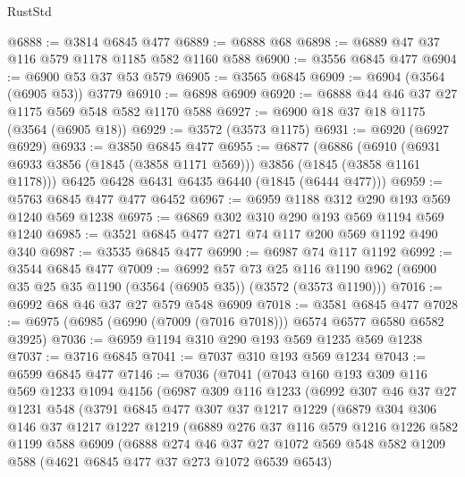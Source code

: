 \begin{lexlean}{RustStd}
\begin{coremodule}
@6888 := @3814 @6845 @477
@6889 := @6888 @68
@6898 := @6889 @47 @37 @116 @579 @1178 @1185 @582 @1160 @588
@6900 := @3556 @6845 @477
@6904 := @6900 @53 @37 @53 @579
@6905 := @3565 @6845
@6909 := @6904 (@3564 (@6905 @53)) @3779
@6910 := @6898 @6909
@6920 := @6888 @44 @46 @37 @27 @1175 @569 @548 @582 @1170 @588
@6927 := @6900 @18 @37 @18 @1175 (@3564 (@6905 @18))
@6929 := @3572 (@3573 @1175)
@6931 := @6920 (@6927 @6929)
@6933 := @3850 @6845 @477
@6955 := @6877
    (@6886
      (@6910 (@6931 @6933 @3856 (@1845 (@3858 @1171 @569))) @3856 (@1845 (@3858 @1161 @1178)))
      @6425
      @6428
      @6431
      @6435
      @6440
      (@1845 (@6444 @477)))
@6959 := @5763 @6845 @477 @477 @6452
@6967 := @6959 @1188 @312 @290 @193 @569 @1240 @569 @1238
@6975 := @6869 @302 @310 @290 @193 @569 @1194 @569 @1240
@6985 := @3521 @6845 @477 @271 @74 @117 @200 @569 @1192 @490 @340
@6987 := @3535 @6845 @477
@6990 := @6987 @74 @117 @1192
@6992 := @3544 @6845 @477
@7009 := @6992
    @57
    @73
    @25
    @116
    @1190
    @962
    (@6900 @35 @25 @35 @1190 (@3564 (@6905 @35)) (@3572 (@3573 @1190)))
@7016 := @6992 @68 @46 @37 @27 @579 @548 @6909
@7018 := @3581 @6845 @477
@7028 := @6975 (@6985 (@6990 (@7009 (@7016 @7018))) @6574 @6577 @6580 @6582 @3925)
@7036 := @6959 @1194 @310 @290 @193 @569 @1235 @569 @1238
@7037 := @3716 @6845
@7041 := @7037 @310 @193 @569 @1234
@7043 := @6599 @6845 @477
@7146 := @7036
    (@7041
      (@7043
        @160
        @193
        @309
        @116
        @569
        @1233
        @1094
        @4156
        (@6987
          @309
          @116
          @1233
          (@6992
            @307
            @46
            @37
            @27
            @1231
            @548
            (@3791
              @6845
              @477
              @307
              @37
              @1217
              @1229
              (@6879
                @304
                @306
                @146
                @37
                @1217
                @1227
                @1219
                (@6889
                  @276
                  @37
                  @116
                  @579
                  @1216
                  @1226
                  @582
                  @1199
                  @588
                  @6909
                  (@6888
                    @274
                    @46
                    @37
                    @27
                    @1072
                    @569
                    @548
                    @582
                    @1209
                    @588
                    (@4621 @6845 @477 @37 @273 @1072 @6539 @6543)

\end{coremodule}
\end{lexlean}
